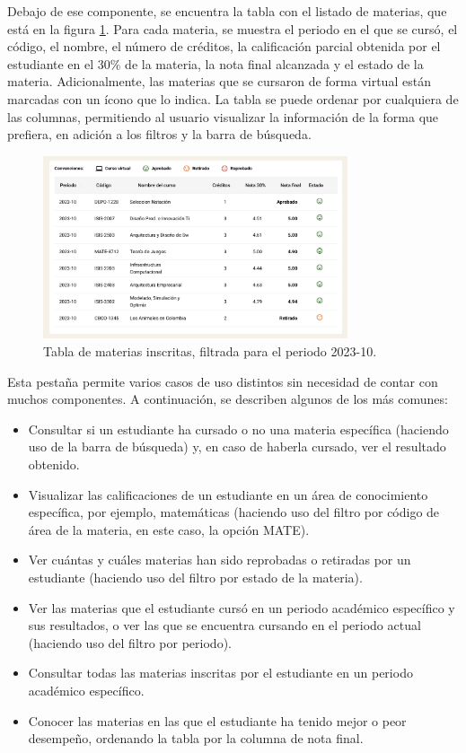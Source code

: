 Debajo de ese componente, se encuentra la tabla con el listado de materias, que está en la figura \ref{fig:tabla_materias}. Para cada materia, se muestra el periodo en el que se cursó, el código, el nombre, el número de créditos, la calificación parcial obtenida por el estudiante en el 30\% de la materia, la nota final alcanzada y el estado de la materia. Adicionalmente, las materias que se cursaron de forma virtual están marcadas con un ícono que lo indica. La tabla se puede ordenar por cualquiera de las columnas, permitiendo al usuario visualizar la información de la forma que prefiera, en adición a los filtros y la barra de búsqueda.

\begin{figure}[H]
  \centering
  \includegraphics[width=0.8\textwidth]{img/nes/tabla_materias.png}
  \caption{Tabla de materias inscritas, filtrada para el periodo 2023-10.}
  \label{fig:tabla_materias}
\end{figure}

Esta pestaña permite varios casos de uso distintos sin necesidad de contar con muchos componentes. A continuación, se describen algunos de los más comunes:
\begin{itemize}
  \item Consultar si un estudiante ha cursado o no una materia específica (haciendo uso de la barra de búsqueda) y, en caso de haberla cursado, ver el resultado obtenido.
  \item Visualizar las calificaciones de un estudiante en un área de conocimiento específica, por ejemplo, matemáticas (haciendo uso del filtro por código de área de la materia, en este caso, la opción MATE).
  \item Ver cuántas y cuáles materias han sido reprobadas o retiradas por un estudiante (haciendo uso del filtro por estado de la materia).
  \item Ver las materias que el estudiante cursó en un periodo académico específico y sus resultados, o ver las que se encuentra cursando en el periodo actual (haciendo uso del filtro por periodo).
  \item Consultar todas las materias inscritas por el estudiante en un periodo académico específico.
  \item Conocer las materias en las que el estudiante ha tenido mejor o peor desempeño, ordenando la tabla por la columna de nota final.
\end{itemize}


